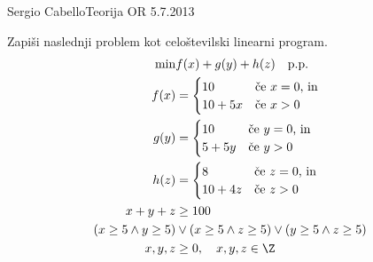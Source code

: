 \begin{naloga}{Sergio Cabello}{Teorija OR 5.7.2013}
\begin{vprasanje}
Zapiši naslednji problem kot celoštevilski linearni program.
\begin{align*}
\min & f(x) + g(y) + h(z) \quad \text{p.p.} \\
f(x) &= \begin{cases}
        10      & \text{če $x = 0$, in} \\
        10 + 5x & \text{če $x > 0$}
        \end{cases} \\
g(y) &= \begin{cases}
        10     & \text{če $y = 0$, in} \\
        5 + 5y & \text{če $y > 0$}
        \end{cases} \\
h(z) &= \begin{cases}
        8       & \text{če $z = 0$, in} \\
        10 + 4z & \text{če $z > 0$}
        \end{cases} \\
x + y + z &\ge 100 \\
      (x \ge 5 \land y \ge 5)
&\lor (x \ge 5 \land z \ge 5)
 \lor (y \ge 5 \land z \ge 5) \\
x, y, z &\ge 0, \quad x, y, z \in \Z
\end{align*}
\end{vprasanje}
\begin{odgovor}
\end{odgovor}
\end{naloga}
